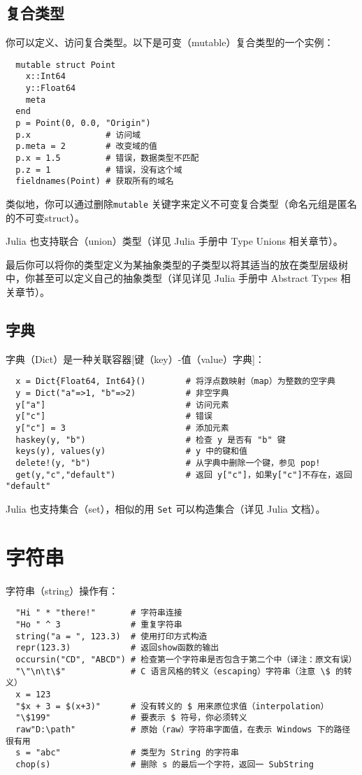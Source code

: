 \documentclass[10pt,a4paper]{article}
\begin{document}
\subsection{复合类型}
你可以定义、访问复合类型。以下是可变（mutable）复合类型的一个实例：
\begin{lstlisting}
  mutable struct Point
    x::Int64
    y::Float64
    meta
  end
  p = Point(0, 0.0, "Origin")
  p.x               # 访问域
  p.meta = 2        # 改变域的值
  p.x = 1.5         # 错误，数据类型不匹配
  p.z = 1           # 错误，没有这个域
  fieldnames(Point) # 获取所有的域名
\end{lstlisting}

类似地，你可以通过删除\lstinline|mutable| 关键字来定义不可变复合类型（命名元组是匿名的不可变struct）。 

Julia 也支持联合（union）类型（详见 Julia 手册中 Type Unions 相关章节）。

最后你可以将你的类型定义为某抽象类型的子类型以将其适当的放在类型层级树中，你甚至可以定义自己的抽象类型（详见详见 Julia 手册中 Abstract Types 相关章节）。

\subsection{字典}
字典（Dict）是一种关联容器[键（key）-值（value）字典]：
\begin{lstlisting}
  x = Dict{Float64, Int64}()        # 将浮点数映射（map）为整数的空字典
  y = Dict("a"=>1, "b"=>2)          # 非空字典
  y["a"]                            # 访问元素
  y["c"]                            # 错误
  y["c"] = 3                        # 添加元素
  haskey(y, "b")                    # 检查 y 是否有 "b" 键
  keys(y), values(y)                # y 中的键和值
  delete!(y, "b")                   # 从字典中删除一个键，参见 pop!
  get(y,"c","default")              # 返回 y["c"]，如果y["c"]不存在，返回 "default"
\end{lstlisting}
Julia 也支持集合（set），相似的用 \lstinline|Set| 可以构造集合（详见 Julia 文档）。

\section{字符串}
字符串（string）操作有：
\begin{lstlisting}
  "Hi " * "there!"       # 字符串连接
  "Ho " ^ 3              # 重复字符串
  string("a = ", 123.3)  # 使用打印方式构造
  repr(123.3)            # 返回show函数的输出
  occursin("CD", "ABCD") # 检查第一个字符串是否包含于第二个中（译注：原文有误）
  "\"\n\t\$"             # C 语言风格的转义（escaping）字符串（注意 \$ 的转义）
  x = 123
  "$x + 3 = $(x+3)"      # 没有转义的 $ 用来原位求值（interpolation）
  "\$199"                # 要表示 $ 符号，你必须转义
  raw"D:\path"           # 原始（raw）字符串字面值，在表示 Windows 下的路径很有用
  s = "abc"              # 类型为 String 的字符串
  chop(s)                # 删除 s 的最后一个字符，返回一 SubString
\end{lstlisting}
\end{document}
